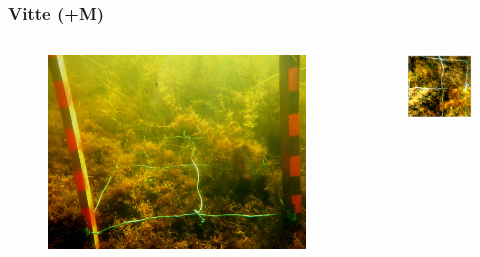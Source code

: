 \documentclass{beamer}
\begin{document}
\begin{frame}
\frametitle{Vitte (+M)}
\begin{columns}
\begin{column}{7.0cm}
\begin{figure}
\includegraphics[height=0.5\textheight]{images/plotpictures/BSP_V+M}
\hspace*{-9mm}
\end{figure}
\end{column}
\begin{column}{5.8cm}
\begin{figure}
\includegraphics[height=0.5\textheight]{images/plotpictures/V+M.png}
\hspace*{+9mm}
\end{figure}
\end{column}
\end{columns}
\end{frame}
\end{document}
